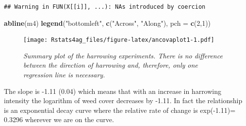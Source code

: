 \documentclass[letterpaper,]{book}
\newenvironment{Shaded}{\begin{snugshade}}{\end{snugshade}}
\newcommand{\DataTypeTok}[1]{\textcolor[rgb]{0.13,0.29,0.53}{#1}}
\newcommand{\DecValTok}[1]{\textcolor[rgb]{0.00,0.00,0.81}{#1}}
\newcommand{\FloatTok}[1]{\textcolor[rgb]{0.00,0.00,0.81}{#1}}
\newcommand{\KeywordTok}[1]{\textcolor[rgb]{0.13,0.29,0.53}{\textbf{#1}}}
\newcommand{\NormalTok}[1]{#1}
\newcommand{\OperatorTok}[1]{\textcolor[rgb]{0.81,0.36,0.00}{\textbf{#1}}}
\newcommand{\StringTok}[1]{\textcolor[rgb]{0.31,0.60,0.02}{#1}}
\begin{document}
\begin{Shaded}
\end{Shaded}

\begin{verbatim}
## Warning in FUN(X[[i]], ...): NAs introduced by coercion
\end{verbatim}

\begin{Shaded}
\begin{Highlighting}[]
\KeywordTok{abline}\NormalTok{(m4)}
\KeywordTok{legend}\NormalTok{(}\StringTok{"bottomleft"}\NormalTok{, }\KeywordTok{c}\NormalTok{(}\StringTok{"Across"}\NormalTok{, }\StringTok{"Along"}\NormalTok{), }\DataTypeTok{pch =} \KeywordTok{c}\NormalTok{(}\DecValTok{2}\NormalTok{,}\DecValTok{1}\NormalTok{))}
\end{Highlighting}
\end{Shaded}

\begin{figure}
\centering
\texttt{[image: Rstats4ag\_files/figure-latex/ancovaplot1-1.pdf]}
\caption{\label{fig:ancovaplot1}\emph{Summary plot of the harrowing experiments. There is no difference between the direction of harrowing and, therefore, only one regression line is necessary.}}
\end{figure}

The slope is -1.11 (0.04) which means that with an increase in harrowing intensity the logarithm of weed cover decreases by -1.11. In fact the relationship is an exponential decay curve where the relative rate of change is exp(-1.11)= 0.3296 wherever we are on the curve.
\end{document}
